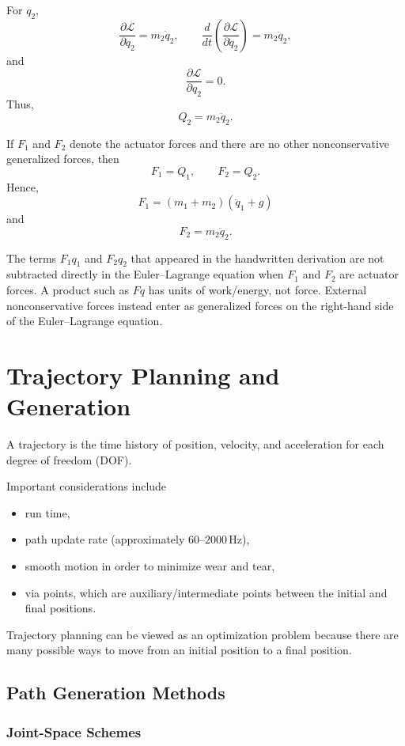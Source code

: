 \documentclass[11pt]{article}
\begin{document}
For $q_2$,
\[
\frac{\partial\mathcal{L}}{\partial\dot q_2}=m_2\dot q_2,
\qquad
\frac{d}{dt}
\left(
\frac{\partial\mathcal{L}}{\partial\dot q_2}
\right)=m_2\ddot q_2,
\]
and
\[
\frac{\partial\mathcal{L}}{\partial q_2}=0.
\]
Thus,
\[
\boxed{Q_2=m_2\ddot q_2}.
\]

If $F_1$ and $F_2$ denote the actuator forces and there are no other nonconservative generalized forces, then
\[
\boxed{F_1=Q_1},
\qquad
\boxed{F_2=Q_2}.
\]
Hence,
\[
\boxed{
F_1=(m_1+m_2)(\ddot q_1+g)
}
\]
and
\[
\boxed{
F_2=m_2\ddot q_2
}.
\]

The terms $F_1q_1$ and $F_2q_2$ that appeared in the handwritten derivation are not subtracted directly in the Euler--Lagrange equation when $F_1$ and $F_2$ are actuator forces. A product such as $Fq$ has units of work/energy, not force. External nonconservative forces instead enter as generalized forces on the right-hand side of the Euler--Lagrange equation.

\section{Trajectory Planning and Generation}

A trajectory is the time history of position, velocity, and acceleration for each degree of freedom (DOF).

Important considerations include
\begin{itemize}
    \item run time,
    \item path update rate (approximately $60$--$2000\,\mathrm{Hz}$),
    \item smooth motion in order to minimize wear and tear,
    \item via points, which are auxiliary/intermediate points between the initial and final positions.
\end{itemize}

Trajectory planning can be viewed as an optimization problem because there are many possible ways to move from an initial position to a final position.

\subsection{Path Generation Methods}

\subsubsection{Joint-Space Schemes}
\end{document}
